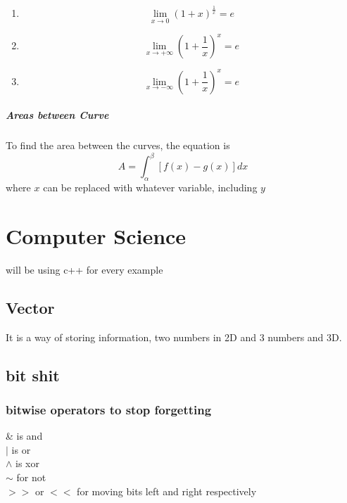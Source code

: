 \documentclass{article} %
\theoremstyle{theorem}
\theoremstyle{definition}
\newtheorem{definition}{Definition}
\begin{document}
                    \begin{enumerate}[label=(\alph*)]
                        \item \begin{equation} \lim_{x\rightarrow0}(1+x)^{\frac{1}{x}}=e \end{equation}
                        \item \begin{equation} \lim_{x\rightarrow +\infty}(1+\frac{1}{x})^x=e \end{equation}
                        \item \begin{equation} \lim_{x\rightarrow -\infty}(1+\frac{1}{x})^x=e \end{equation}
                    \end{enumerate}
                \subparagraph{Areas between Curve}
                    To find the area between the curves, the equation is \begin{equation}
                        A=\int_{\alpha}^{\beta}[f(x)-g(x)]dx
                        \label{eq:AreaBtCurve}
                    \end{equation}
                    where $x$ can be replaced with whatever variable, including $y$
                    
\pagebreak
\section{Computer Science}\label{sec:csSec}
will be using c++ for every example
    \subsection{Vector}\label{sub:csVec}
    It is a way of storing information, two numbers in 2D and 3 numbers and 3D.
    \subsection{bit shit}
        \subsubsection{bitwise operators to stop forgetting}
            \begin{center}
                \& is and\\$|$ is or\\$\wedge$ is xor\\$\sim$ for not\\$>>$ or $<<$ for moving bits left and right respectively
            \end{center}
\end{document}
